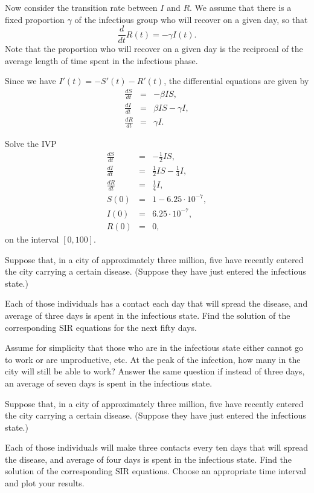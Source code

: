  Now consider the transition rate between $I$ and $R$. We assume that there is a fixed proportion $\gamma$ of the infectious group who will recover on a given day, so that 
 \[\frac{d}{dt}R(t) = -\gamma I(t).\]
 Note that the proportion who will recover on a given day is the reciprocal of the average length of time spent in the infectious phase. 
 
 Since we have $I'(t) = - S'(t) - R'(t)$, the  differential equations are given by
\begin{eqnarray*}
\frac{dS}{dt} &=&-\beta IS ,\\
\frac{dI}{dt} &=& \beta I S-\gamma I, \\
\frac{dR}{dt} &=&\gamma I.
\end{eqnarray*}


\begin{problem}
Solve the IVP
\begin{eqnarray*}
\frac{dS}{dt} &=&-\frac{1}{2} IS ,\\
\frac{dI}{dt} &=& \frac{1}{2} I S-\frac{1}{4} I, \\
\frac{dR}{dt} &=&\frac{1}{4} I,\\
S(0) &=& 1-6.25\cdot10^{-7},\\
I(0) &=& 6.25\cdot10^{-7},\\
R(0) &=&0,
\end{eqnarray*}
on the interval $[0,100]$.
\end{problem}


\begin{problem}
Suppose that, in a city of approximately three million, five have recently entered the city carrying a certain disease. (Suppose they have just entered the infectious state.)

Each of those individuals has a contact each day that will spread the disease, and average of three days is spent in the infectious state. Find the solution of the corresponding SIR equations for the next fifty days. 

Assume for simplicity that those who are in the infectious state either cannot go to work or are unproductive, etc. At the peak of the infection, how many in the city will still be able to work? 
Answer the same question if instead of three days, an average of seven days is spent in the infectious state.
\end{problem}


\begin{problem}
Suppose that, in a city of approximately three million, five have recently entered the city carrying a certain disease. (Suppose they have just entered the infectious state.) 

Each of those individuals will make three contacts every ten days that will spread the disease, and average of four days is spent in the infectious state. Find the solution of the corresponding SIR equations. Choose an appropriate time interval and plot your results.
\end{problem}


